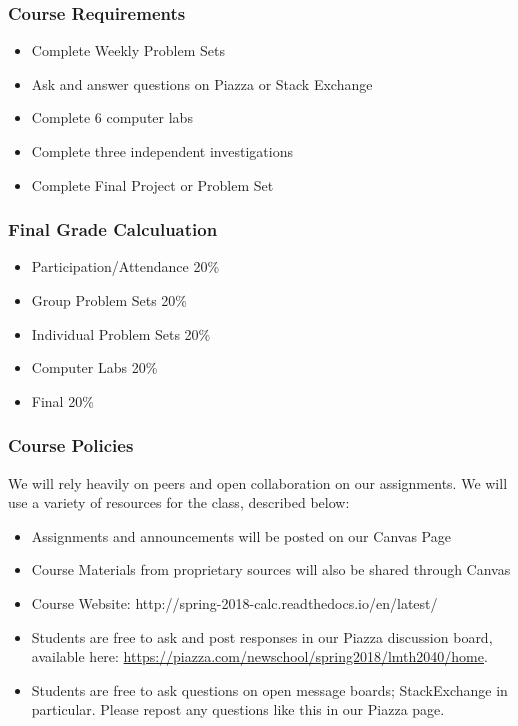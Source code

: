 \documentclass[11pt]{article}
\providecommand{\tightlist}{%
      \setlength{\itemsep}{0pt}\setlength{\parskip}{0pt}}
\begin{document}
\subsubsection{Course Requirements}\label{course-requirements}

\begin{itemize}
\tightlist
\item
  Complete Weekly Problem Sets
\item
  Ask and answer questions on Piazza or Stack Exchange
\item
  Complete 6 computer labs
\item
  Complete three independent investigations
\item
  Complete Final Project or Problem Set
\end{itemize}

\subsubsection{Final Grade Calculuation}\label{final-grade-calculuation}

\begin{itemize}
\tightlist
\item
  Participation/Attendance 20\%
\item
  Group Problem Sets 20\%
\item
  Individual Problem Sets 20\%
\item
  Computer Labs 20\%
\item
  Final 20\%
\end{itemize}

\subsubsection{Course Policies}\label{course-policies}

We will rely heavily on peers and open collaboration on our assignments.
We will use a variety of resources for the class, described below:

\begin{itemize}
\tightlist
\item
  Assignments and announcements will be posted on our Canvas Page
\item
  Course Materials from proprietary sources will also be shared through
  Canvas
\item
  Course Website: http://spring-2018-calc.readthedocs.io/en/latest/
\item
  Students are free to ask and post responses in our Piazza discussion
  board, available here:
  \url{https://piazza.com/newschool/spring2018/lmth2040/home}.
\item
  Students are free to ask questions on open message boards;
  StackExchange in particular. Please repost any questions like this in
  our Piazza page.
\end{itemize}
\end{document}
